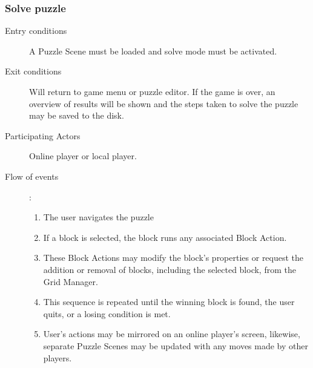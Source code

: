 \documentclass[12pt]{article}
\begin{document}
    \subsubsection{Solve puzzle}
    \begin{description}
        \item[Entry conditions] A Puzzle Scene must be loaded and solve mode
            must be activated.
        \item[Exit conditions] Will return to game menu or puzzle editor.
            If the game is over, an overview of results will be shown and the
            steps taken to solve the puzzle may be saved to the disk.
        \item[Participating Actors] Online player or local player.
        \item[Flow of events]:
            \begin{enumerate}
                \item The user navigates the puzzle
                \item If a block is selected, the block runs any associated
                    Block Action.
                \item These Block Actions may modify the block's properties or
                    request the addition or removal of blocks, including the
                    selected block, from the Grid Manager.
                \item This sequence is repeated until the winning block is
                    found, the user quits, or a losing condition is met.
                \item User's actions may be mirrored on an online player's
                    screen, likewise, separate Puzzle Scenes  may be updated
                    with any moves made by other players.
            \end{enumerate}
    \end{description}


\end{document}
